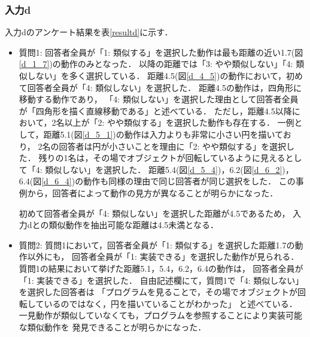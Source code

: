 \documentclass[11pt]{jreport}
\begin{document}
\subsubsection{入力d}
入力dのアンケート結果を表\ref{resultd}に示す．

\begin{itemize}
    \item 質問1: 回答者全員が「1: 類似する」を選択した動作は最も距離の近い1.7(図\ref{d_1_7})の動作のみとなった．
    以降の距離では「3: やや類似しない」「4: 類似しない」を多く選択している．
    距離4.5(図\ref{d_4_5})の動作において，初めて回答者全員が「4: 類似しない」を選択した．
    距離4.5の動作は，四角形に移動する動作であり，
    「4: 類似しない」を選択した理由として回答者全員が「四角形を描く直線移動である」と述べている．
    ただし，距離4.5以降において，2名以上が「2: やや類似する」を選択した動作も存在する．
    一例として，距離5.1(図\ref{d_5_1})の動作は入力よりも非常に小さい円を描いており，
    2名の回答者は円が小さいことを理由に「2: やや類似する」を選択した．
    残りの1名は，その場でオブジェクトが回転しているように見えるとして「4: 類似しない」を選択した．
    距離5.4(図\ref{d_5_4})，6.2(図\ref{d_6_2})，6.4(図\ref{d_6_4})の動作も同様の理由で同じ回答者が同じ選択をした．
    この事例から，回答者によって動作の見方が異なることが明らかになった．
    
    初めて回答者全員が「4: 類似しない」を選択した距離が4.5であるため，
    入力dとの類似動作を抽出可能な距離は4.5未満となる．

    \item 質問2: 質問1において，回答者全員が「1: 類似する」を選択した距離1.7の動作以外にも，
    回答者全員が「1: 実装できる」を選択した動作が見られる．
    質問1の結果において挙げた距離5.1，5.4，6.2，6.4の動作は，
    回答者全員が「1: 実装できる」を選択した．
    自由記述欄にて，質問1で「4: 類似しない」を選択した回答者は
    「プログラムを見ることで，その場でオブジェクトが回転しているのではなく，円を描いていることがわかった」
    と述べている．
    一見動作が類似していなくても，プログラムを参照することにより実装可能な類似動作を
    発見できることが明らかになった．
\end{itemize}
\end{document}
